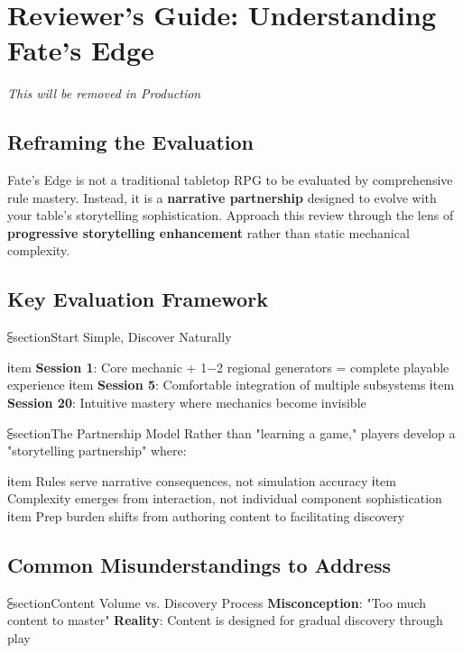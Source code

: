 \section{Reviewer's Guide: Understanding Fate's Edge}

\textit{This will be removed in Production}

\subsection{Reframing the Evaluation}

Fate's Edge is not a traditional tabletop RPG to be evaluated by comprehensive rule mastery. Instead, it is a \textbf{narrative partnership} designed to evolve with your table's storytelling sophistication. Approach this review through the lens of \textbf{progressive storytelling enhancement} rather than static mechanical complexity.

\subsection{Key Evaluation Framework}

⫕section{Start Simple, Discover Naturally}
\begin{itemize}
    ℹtem \textbf{Session 1}: Core mechanic + 1−2 regional generators = complete playable experience
    ℹtem \textbf{Session 5}: Comfortable integration of multiple subsystems
    ℹtem \textbf{Session 20}: Intuitive mastery where mechanics become invisible
\end{itemize}

⫕section{The Partnership Model}
Rather than "learning a game," players develop a "storytelling partnership" where:
\begin{itemize}
    ℹtem Rules serve narrative consequences, not simulation accuracy
    ℹtem Complexity emerges from interaction, not individual component sophistication  
    ℹtem Prep burden shifts from authoring content to facilitating discovery
\end{itemize}

\subsection{Common Misunderstandings to Address}

⫕section{Content Volume vs. Discovery Process}
\textbf{Misconception}: "Too much content to master"
\textbf{Reality}: Content is designed for gradual discovery through play

